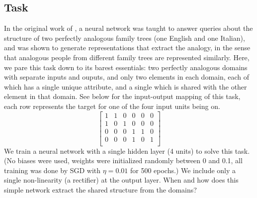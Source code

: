 \documentclass[10pt,letterpaper]{article}
\begin{document}
\subsection{Task}
In the original work of \citet{Hinton1986}, a neural network was taught to answer queries about the structure of two perfectly analogous family trees (one English and one Italian), and was shown to generate representations that extract the analogy, in the sense that analogous people from different family trees are represented similarly. Here, we pare this task down to its barest essentials: two perfectly analogous domains with separate inputs and ouputs, and only two elements in each domain, each of which has a single unique attribute, and a single which is shared with the other element in that domain. See below for the input-output mapping of this task, each row represents the target for one of the four input units being on.
\[
\left[ \begin{matrix} 
1 & 1 & 0 & 0 & 0 & 0 \\
1 & 0 & 1 & 0 & 0 & 0 \\
 0 & 0 & 0 & 1 & 1 & 0\\
 0 & 0 & 0 & 1 & 0 & 1\\
\end{matrix}  \right] 
\]
 We train a neural network with a single hidden layer (4 units) to solve this task. (No biases were used, weights were initialized randomly between 0 and 0.1, all training was done by SGD with \(\eta = 0.01\) for 500 epochs.) We include only a single non-linearity (a rectifier) at the output layer. When and how does this simple network extract the shared structure from the domains? \par
\end{document}
